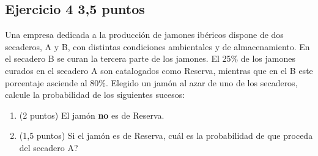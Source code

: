 \documentclass[11pt]{article}
\begin{document}
\subsection*{Ejercicio 4 \hfill 3,5 puntos}  
Una empresa dedicada a la producción de jamones ibéricos dispone de dos secaderos, A y B, con distintas condiciones ambientales y de almacenamiento. En el secadero B se curan la tercera parte de los jamones. El 25\% de los jamones curados en el secadero A son catalogados como Reserva, mientras que en el B este porcentaje asciende al 80\%.  
Elegido un jamón al azar de uno de los secaderos, calcule la probabilidad de los siguientes sucesos:

\begin{enumerate}[label=(\alph*)]

\item (2 puntos)  El jamón \textbf{no} es de Reserva.



\item (1,5 puntos)  Si el jamón es de Reserva, \textquestiondown{}cuál es la probabilidad de que proceda del secadero A?



\end{enumerate}
\end{document}
